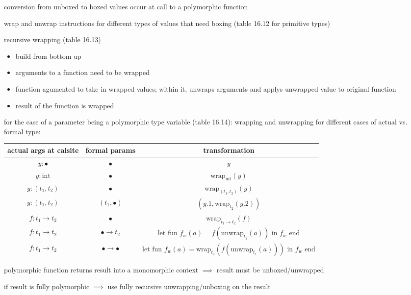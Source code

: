 \documentclass[8pt]{extarticle}
\begin{document}
\begin{multicols*}{2}
  conversion from unboxed to boxed values occur at call to a polymorphic function

  wrap and unwrap instructions for different types of values that need boxing (table 16.12 for primitive types)

  recursive wrapping (table 16.13)
  \begin{itemize}
  \item build from bottom up
  \item arguments to a function need to be wrapped
  \item function agumented to take in wrapped values; within it, unwraps arguments and applys unwrapped value to original function
  \item result of the function is wrapped
  \end{itemize}

  for the case of a parameter being a polymorphic type variable (table 16.14): wrapping and unwrapping for different cases of actual vs. formal type:
  
  \begin{center}
    \begin{tabular}{ | c | c | c |}
      \hline
      actual args at calsite & formal params & transformation \\
      \hline
      $y: \bullet$ & $\bullet$ & $y$\\
      $y: \text{int}$ & $\bullet$ & $\text{wrap}_{\text{int}}(y)$\\
      $y: (t_1, t_2)$ & $\bullet$ & $\text{wrap}_{(t_1,t_2)}(y)$\\
      $y: (t_1, t_2)$ & $(t_1, \bullet)$ & $(y.1, \text{wrap}_{t_2}(y.2))$\\
      $f: t_1 \rightarrow t_2$ & $\bullet$ & $\text{wrap}_{t_1 \rightarrow t_2}(f)$\\
      $f: t_1 \rightarrow t_2$ & $\bullet \rightarrow t_2$ & $\text{let fun }f_w(a) = f(\text{unwrap}_{t_1}(a)) \text{ in }f_w \text{ end}$\\
      $f: t_1 \rightarrow t_2$ & $\bullet \rightarrow \bullet$ & $\text{let fun }f_w(a) = \text{wrap}_{t_2}(f(\text{unwrap}_{t_1}(a))) \text{ in }f_w \text{ end}$\\
      \hline 
    \end{tabular}
  \end{center}

  polymorphic function returns result into a monomorphic context $\implies$ result must be unboxed/unwrapped

  if result is fully polymorphic $\implies$ use fully recursive unwrapping/unboxing on the result


\end{multicols*}
\end{document}
